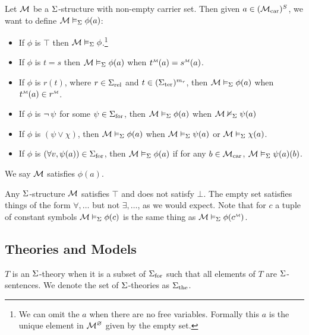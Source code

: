 \begin{dfn}
    Let $\mathcal{M}$ be a $\Si$-structure with non-empty carrier set.
    Then given $a \in ({\mathcal{M}}_\mathrm{car})^S$, 
    we want to define $\mathcal{M} \vDash_{\Sigma} \phi(a)$:
    \begin{itemize}
        \item If $\phi$ is $\top$ then $\mathcal{M} \vDash_{\Sigma} \phi$.\footnote{
            We can omit the $a$ when there are no free variables.
            Formally this $a$ is the unique element in $\mathcal{M}^\varnothing$
            given by the empty set.}
        \item If $\phi$ is $t = s$ then
            $\mathcal{M} \vDash_{\Sigma} \phi(a)$ when 
            $\modintp{\MM}{t}(a) = \modintp{\MM}{s}(a)$.
            \item If $\phi$ is $r(t)$, 
            where $r \in {\Sigma}_\mathrm{rel}$ and 
            $t \in ({\Sigma}_\mathrm{ter})^{m_r}$,
            then $\mathcal{M} \vDash_{\Sigma} \phi(a)$ when 
            $\modintp{\MM}{t}(a) \in \modintp{\MM}{r}$.
            \vspace{1em}
        \item If $\phi$ is 
            $\neg\,\psi$ for some $\psi \in {\Sigma}_\mathrm{for}$, 
            then $\mathcal{M} \vDash_{\Sigma} \phi(a)$ when $\mathcal{M} \nvDash_{\Sigma} \psi(a)$
        \item If $\phi$ is  $(\psi \lor \chi)$, 
            then $\mathcal{M} \vDash_{\Sigma} \phi(a)$ when 
            $\mathcal{M} \vDash_{\Sigma} \psi(a)$ or $\mathcal{M} \vDash_{\Sigma} \chi(a)$.
        \item If $\phi$ is 
            $(\forall v, \psi(a)) \in {\Sigma}_\mathrm{for}$,
            then $\mathcal{M} \vDash_{\Sigma} \phi(a)$ 
            if for any $b \in {\mathcal{M}}_\mathrm{car}$,   
            $\mathcal{M} \vDash_{\Sigma} \psi(a)(b)$.
    \end{itemize}
    We say $\mathcal{M}$ satisfies $\phi(a)$.
\end{dfn}
\begin{rmk}
    Any $\Si$-structure $\mathcal{M}$ satisfies $\top$ 
    and does not satisfy $\bot$.
    The empty set satisfies things of the form $\forall, \dots$ 
    but not $\exists, \dots$, as we would expect.
    Note that for $c$ a tuple of constant symbols
    $\mathcal{M} \vDash_{\Sigma} \phi(c)$ is the same thing as 
    $\MM \model{\Si} \phi(\mmintp{c})$.
\end{rmk}

\subsection{Theories and Models}
\begin{dfn}[$\Si$-theory]
    $T$ is an $\Si$-theory when it is a subset of ${\Sigma}_\mathrm{for}$
    such that all elements of $T$ are $\Si$-sentences.
    We denote the set of $\Si$-theories as ${\Sigma}_\mathrm{the}$.
\end{dfn}

